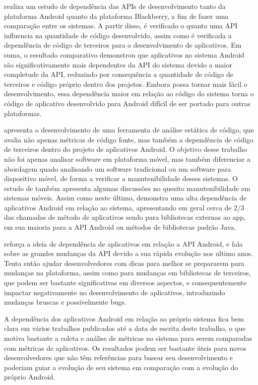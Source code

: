   realiza um estudo de dependência das APIs de desenvolvimento tanto da plataforma Android quanto da plataforma Blackberry, a fim de fazer uma comparação entre os sistemas. A partir disso, é verificado o quanto uma API influencia na quantidade de código desenvolvido, assim como é verificada a dependência de código de terceiros para o desenvolvimento de aplicativos. Em suma, o resultado comparativo demonstrou que aplicativos no sistema Android são significativamente mais dependentes da API do sistema devido a maior completude da API, reduzindo por consequência a quantidade de código de terceiros e código próprio dentro dos projetos. Embora possa tornar mais fácil o desenvolvimento, essa dependência maior em relação ao código do sistema torna o código de aplicativo desenvolvido para Android difícil de ser portado para outras plataformas.

 apresenta o desenvolvimento de uma ferramenta de análise estática de código, que avalia não apenas métricas de código fonte, mas também a dependência de código de terceiros dentro do projeto de aplicativos Android. O objetivo desse trabalho não foi apenas analisar software em plataforma móvel, mas também diferenciar a abordagem quado analisando um software tradicional ou um software para dispositivo móvel, de forma a verificar a manutenibilidade desses sistemas. O estudo de  também apresenta algumas discussões no quesito manutenibilidade em sistemas móveis. Assim como neste último,  demonstra uma alta dependência de aplicativos Android em relação ao sistema, apresentando em geral cerca de  2/3 das chamadas de método de aplicativos sendo para bibliotecas externas ao app, em sua maioria para a API Android ou métodos de bibliotecas padrão Java.

 reforça a ideia de dependência de aplicativos em relação a API Android, e fala sobre as grandes mudanças da API devido a sua rápida evolução nos ultimo anos. Tenta então ajudar desenvolvedores com dicas para melhor se prepararem para mudanças na plataforma, assim como para mudanças em bibliotecas de terceiros, que podem ser bastante significativas em diversos aspectos, e consequentemente impactar negativamente no desenvolvimento de aplicativos, introduzindo mudanças bruscas e possivelmente bugs.

A dependência dos aplicativos Android em relação ao próprio sistema fica bem clara em vários trabalhos publicados até a data de escrita deste trabalho, o que motiva bastante a coleta e análise de métricas no sistema para serem comparadas com métricas de aplicativos. Os resultados podem ser bastante úteis para novos desenvolvedores que não têm referências para basear seu desenvolvimento e poderiam guiar a evolução de seu sistema em comparação com a evolução do próprio Android.

